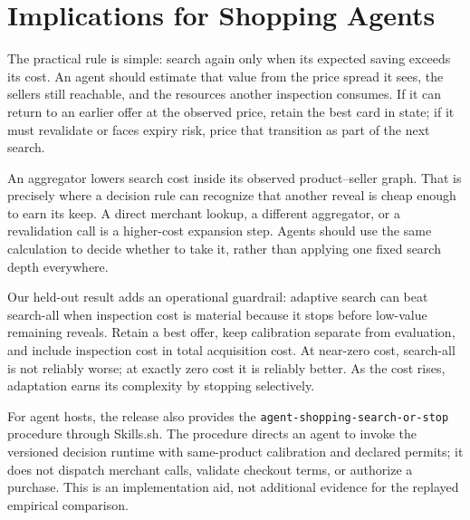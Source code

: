 \section{Implications for Shopping Agents}
\label{sec:implications}

The practical rule is simple: search again only when its expected saving exceeds its
cost. An agent should estimate that value from the price spread it sees, the sellers
still reachable, and the resources another inspection consumes. If it can return to
an earlier offer at the observed price, retain the best card in state; if it must
revalidate or faces expiry risk, price that transition as part of the next search.

An aggregator lowers search cost inside its observed product--seller graph. That is
precisely where a decision rule can recognize that another reveal is cheap enough to
earn its keep. A direct merchant lookup, a different aggregator, or a revalidation
call is a higher-cost expansion step. Agents should use the same calculation to
decide whether to take it, rather than applying one fixed search depth everywhere.

Our held-out result adds an operational guardrail: adaptive search can beat search-all
when inspection cost is material because it stops before low-value remaining reveals.
Retain a best offer, keep calibration separate from evaluation, and include inspection
cost in total acquisition cost. At near-zero cost, search-all is not reliably worse;
at exactly zero cost it is reliably better. As the cost rises, adaptation earns its
complexity by stopping selectively.

For agent hosts, the release also provides the \texttt{agent-shopping-search-or-stop}
 procedure through Skills.sh. The procedure directs an agent to invoke the versioned
 decision runtime with same-product calibration and declared permits; it does not
 dispatch merchant calls, validate checkout terms, or authorize a purchase. This is an
 implementation aid, not additional evidence for the replayed empirical comparison.